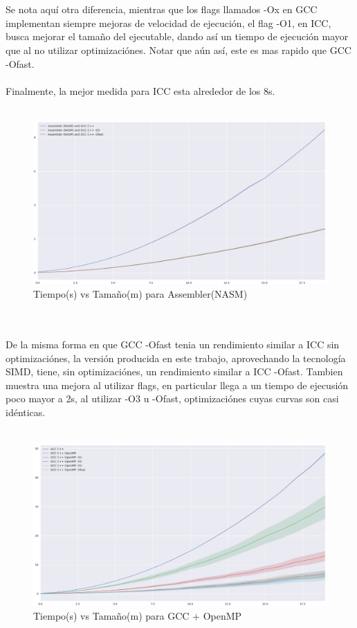 ~\\
~\\
Se nota aquí otra diferencia, mientras que los flags llamados -Ox en GCC implementan siempre mejoras de velocidad de ejecución, el flag -O1, en ICC, busca mejorar el tamaño del ejecutable, dando así un tiempo de ejecución mayor que al no utilizar optimizaciónes. Notar que aún así, este es mas rapido que GCC -Ofast.
~\\
~\\
Finalmente, la mejor medida para ICC esta alrededor de los 8s.
~\\
~\\
\begin{figure}[H]
\caption{Tiempo(s) vs Tamaño(m) para Assembler(NASM)}
\includegraphics[width=\textwidth]{imagenes/plot_asm.png}
\end{figure}
~\\
~\\
De la misma forma en que GCC -Ofast tenia un rendimiento similar a ICC sin optimizaciónes, la versión producida en este trabajo, aprovechando la tecnología SIMD, tiene, sin optimizaciónes, un rendimiento similar a ICC -Ofast. Tambien muestra una mejora al utilizar flags, en particular llega a un tiempo de ejecusión poco mayor a 2s, al utilizar -O3 u -Ofast, optimizaciónes cuyas curvas son casi idénticas.
~\\
~\\
\begin{figure}[H]
\caption{Tiempo(s) vs Tamaño(m) para GCC + OpenMP}
\includegraphics[width=\textwidth]{imagenes/plot_omp.png}
\end{figure}
